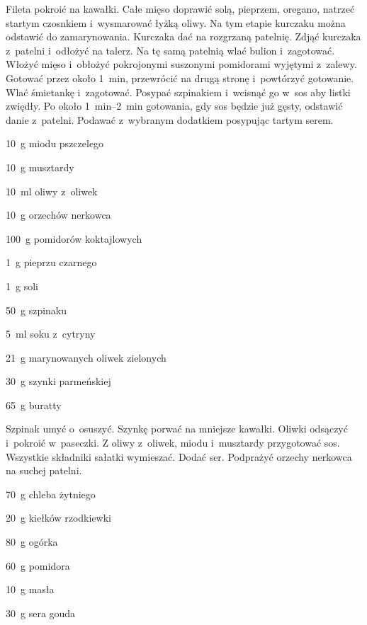 \documentclass[../main.tex]{subfiles}
\begin{document}
Fileta pokroić na kawałki. Całe mięso doprawić solą, pieprzem, oregano, natrzeć
startym czosnkiem i~wysmarować łyżką oliwy. Na tym etapie kurczaku można
odstawić do zamarynowania. Kurczaka dać na rozgrzaną patelnię. Zdjąć kurczaka
z~patelni i~odłożyć na talerz. Na tę samą patelnią wlać bulion i~zagotować.
Włożyć mięso i~obłożyć pokrojonymi suszonymi pomidorami wyjętymi z~zalewy.
Gotować przez około \qty{1}{\minute}, przewrócić na drugą stronę i~powtórzyć
gotowanie. Wlać śmietankę i~zagotować. Posypać szpinakiem i~wcisnąć go w~sos
aby listki zwiędły. Po około \qtyrange{1}{2}{\minute} gotowania, gdy sos będzie
już gęsty, odstawić danie z~patelni. Podawać z~wybranym dodatkiem posypując
tartym serem.


\begin{Ingred}
    \item \qty{10}{\gram} miodu pszczelego
    \item \qty{10}{\gram} musztardy
    \item \qty{10}{\milli\litre} oliwy z~oliwek
    \item \qty{10}{\gram} orzechów nerkowca
    \item \qty{100}{\gram} pomidorów koktajlowych
    \item \qty{1}{\gram} pieprzu czarnego
    \item \qty{1}{\gram} soli
    \item \qty{50}{\gram} szpinaku
    \item \qty{5}{\milli\litre} soku z~cytryny
    \item \qty{21}{\gram} marynowanych oliwek zielonych
    \item \qty{30}{\gram} szynki parmeńskiej
    \item \qty{65}{\gram} buratty
\end{Ingred}

Szpinak umyć o~osuszyć. Szynkę porwać na mniejsze kawałki. Oliwki odsączyć
i~pokroić w~paseczki. Z oliwy z~oliwek, miodu i~musztardy przygotować sos.
Wszystkie składniki sałatki wymieszać. Dodać ser. Podprażyć orzechy nerkowca na
suchej patelni.


\begin{Ingred}
    \item \qty{70}{\gram} chleba żytniego
    \item \qty{20}{\gram} kiełków rzodkiewki
    \item \qty{80}{\gram} ogórka
    \item \qty{60}{\gram} pomidora
    \item \qty{10}{\gram} masła
    \item \qty{30}{\gram} sera gouda
\end{Ingred}
\end{document}
